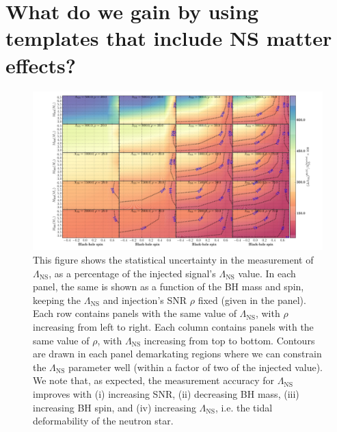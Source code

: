\documentclass[aps,prd,amsmath,floats,floatfix, twocolumn,
superscriptaddress,nofootinbib,showpacs]{revtex4-1}
\newcommand{\lambdans}{\Lambda_\mathrm{NS}}
\begin{document}
\section{What do we gain by using templates that include NS matter effects?}\label{s1:PEwithNS}
% 
\begin{figure}
\centering    
\includegraphics[trim={3cm 0 0 0},width=2.\columnwidth]{plots/TTLambdaCIWidths90_0_Lambda_SNR.pdf}
\caption{This figure shows the statistical uncertainty in the measurement of
$\lambdans$, as a percentage of the injected signal's $\lambdans$ value. In each panel,
the same is shown as a function of the BH mass and spin, keeping the 
$\lambdans$ and injection's SNR $\rho$ fixed (given in the panel). Each row contains
panels with the same value of $\lambdans$, with $\rho$ increasing from left to right.
Each column contains panels with the same value of $\rho$, with $\lambdans$ 
increasing from top to bottom.
% 
Contours are drawn in each panel demarkating regions where we can constrain the
$\lambdans$ parameter well (within a factor of two of the injected value).
% 
We note that, as expected, the measurement accuracy for $\lambdans$ improves with (i) increasing
SNR, (ii) decreasing BH mass, (iii) increasing BH spin, and 
(iv) increasing $\lambdans$, i.e. the tidal deformability of the neutron star.
}
\label{fig:TT_LambdaCIWidths90_0_Lambda_SNR}
\end{figure}
% 
\end{document}

